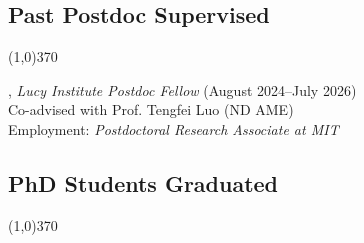 \documentclass[10pt]{article}
\newenvironment{myindentpar}[1]%
{\begin{list}{}%
         {\setlength{\leftmargin}{#1}}%
         \item[]%
}
{\end{list}}
\newcounter{list}
\begin{document}
\subsection{\sc Past Postdoc Supervised}
\vspace{-0.4cm} \line(1,0){370} \vspace{-0.1cm}

\begin{myindentpar}{0.75cm}

\hspace{-0.75cm}{\bf Sobin Alosious}, \textit{Lucy Institute Postdoc Fellow} (August 2024--July 2026) \\
	{Co-advised with Prof. Tengfei Luo (ND AME)} \\
	{Employment: \textit{Postdoctoral Research Associate at MIT}}	

\end{myindentpar}

\subsection{\sc PhD Students Graduated}
\vspace{-0.4cm} \line(1,0){370} \vspace{-0.1cm}
\end{document}
